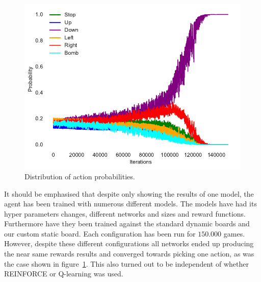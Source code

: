 \begin{figure}[htb]
    \centerline{\includegraphics[width=1.0\linewidth]{pommerman/plots/a_probs.pdf}}
    \caption{Distribution of action probabilities.}\label{fig:act}
\end{figure}

It should be emphasised that despite only showing the results of one model, the agent has been trained with numerous different models. The models have had its hyper parameters changes, different networks and sizes and reward functions. Furthermore have they been trained against the standard dynamic boards and our custom static board. Each configuration has been run for $150.000$ games. However, despite these different configurations all networks ended up producing the near same rewards results and converged towards picking one action, as was the case shown in figure~\ref{fig:act}. This also turned out to be independent of whether REINFORCE or Q-learning was used.



